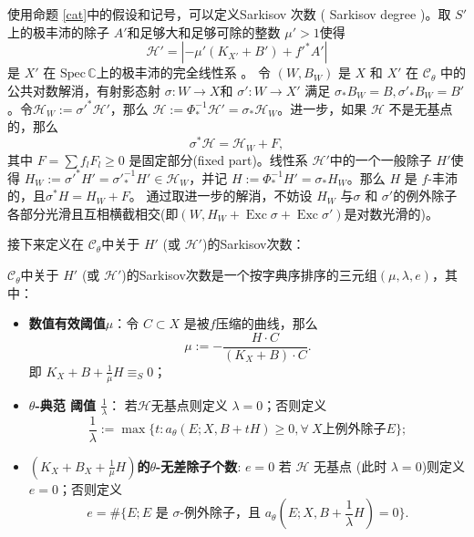 使用命题 \ref{cat}中的假设和记号，可以定义Sarkisov 次数 ( Sarkisov degree )。取 $S'$ 上的极丰沛的除子 $A'$和足够大和足够可除的整数 $\mu'>1 $使得
\[ \mathcal{H}'=|-\mu' (K_{X'}+B') +f'^*A'| \]
是 $ X' $ 在 $ \mathrm{Spec}\,\mathbb{C}$上的极丰沛的完全线性系 。 令 $ (W,B_W) $ 是 $ X $ 和 $ X' $ 在 $ \mathcal{C}_{\theta} $ 中的公共对数解消，有射影态射 $ \sigma:W\to X$和   $\sigma':W\to X' $ 满足 $\sigma_*B_W=B, \sigma'_*B_W=B' $。令$\mathcal{H}_W:=\sigma'^*\mathcal{H}'$，那么  $\mathcal{H}:=\Phi^{-1}_*\mathcal{H}'=\sigma_*\mathcal{H}_W$。进一步，如果 $ \mathcal{H} $ 不是无基点的，那么
\[ \sigma^*\mathcal{H}=\mathcal{H}_W+F ,\]
其中 $ F=\sum f_{l}F_{l}\geqslant0 $ 是固定部分(fixed part)。线性系 $ \mathcal{H}' $中的一个一般除子 $H'$使得 $ H_W:=\sigma'^*H'=\sigma'^{-1}_*H'\in \mathcal{H}_W $，并记 $ H:=\Phi^{-1}_*H'=\sigma_*H_{W} $。那么 $H$ 是 $f$-丰沛的，且$ \sigma^*H=H_W+F $。 通过取进一步的解消，不妨设 $H_{W}$ 与$\sigma$ 和 $\sigma'$的例外除子各部分光滑且互相横截相交(即$(W,H_{W}+ \operatorname{Exc}\sigma+ \operatorname{Exc}\sigma')$是对数光滑的)。


接下来定义在 $\mathcal{C}_{\theta}$中关于 $H'$ (或 $\mathcal{H}'$)的Sarkisov次数：
\begin{definition}\label{sarkisovdegree}
  \cite[Definition 3.8]{brunoLogSarkisovProgram1995}
 $\mathcal{C}_{\theta}$中关于 $H'$ (或 $\mathcal{H}'$)的Sarkisov次数是一个按字典序排序的三元组$ (\mu,\lambda,e) $，其中：
  \begin{itemize}
    \item \textbf{ 数值有效阈值$ \mu $}：令 $ C\subset X  $ 是被$ f $压缩的曲线，那么
          \[ \mu:=-\frac{H\cdot C}{(K_X+B)\cdot C} .\]
          即 $ K_X+B+\frac{1}{\mu} H \equiv_S0$；
    \item \textbf{$ \theta $-典范 阈值  $ \frac{1}{\lambda} $}：  若$ \mathcal{H} $无基点则定义 $\lambda=0$；否则定义
          \[ \frac{1}{\lambda}:=\max\{t:a_{\theta}(E;X,B+tH)\geqslant 0,  \forall \ X\text{上例外除子}E \};\]
    \item \textbf{ $(K_{X}+B_{X}+\frac{1}{\mu}H)$的$\theta$-无差除子个数}:  $ e=0 $ 若 $ \mathcal{H} $ 无基点 (此时 $ \lambda=0 $)则定义  $e=0$；否则定义
          \[ e=\#\{E; E \text{ 是 }\sigma\text{-例外除子，且 } a_{\theta}(E;X,B+\frac{1}{\lambda} H)=0 \} .\]
  \end{itemize}
\end{definition}

